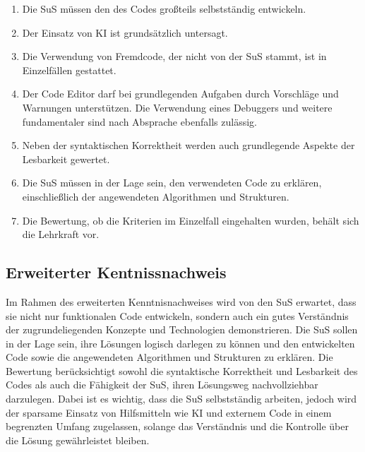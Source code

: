 \documentclass[a4paper,12pt]{article}
\begin{document}
\begin{enumerate}[label=\S\ \arabic*]
    \item Die SuS müssen den des Codes großteils selbstständig entwickeln.
    \item Der Einsatz von KI ist grundsätzlich untersagt.
    \item Die Verwendung von Fremdcode, der nicht von der SuS stammt, ist in Einzelfällen  gestattet.
    \item Der Code Editor darf bei grundlegenden Aufgaben durch Vorschläge und Warnungen unterstützen. Die Verwendung eines Debuggers und weitere fundamentaler sind nach Absprache ebenfalls zulässig.
    \item Neben der syntaktischen Korrektheit werden auch grundlegende Aspekte der Lesbarkeit gewertet.
    \item Die SuS müssen in der Lage sein, den verwendeten Code zu erklären, einschließlich der angewendeten Algorithmen und Strukturen.
    \item Die Bewertung, ob die Kriterien im Einzelfall eingehalten wurden, behält sich die Lehrkraft vor.
\end{enumerate}


\subsection{Erweiterter Kentnissnachweis}
Im Rahmen des erweiterten Kenntnisnachweises wird von den SuS erwartet, dass sie nicht nur funktionalen Code entwickeln, sondern auch ein gutes Verständnis der zugrundeliegenden Konzepte und Technologien demonstrieren. Die SuS sollen in der Lage sein, ihre Lösungen logisch darlegen zu können und den entwickelten Code sowie die angewendeten Algorithmen und Strukturen zu erklären. Die Bewertung berücksichtigt sowohl die syntaktische Korrektheit und Lesbarkeit des Codes als auch die Fähigkeit der SuS, ihren Lösungsweg nachvollziehbar darzulegen. Dabei ist es wichtig, dass die SuS selbstständig arbeiten, jedoch wird der sparsame Einsatz von Hilfsmitteln wie KI und externem Code in einem begrenzten Umfang zugelassen, solange das Verständnis und die Kontrolle über die Lösung gewährleistet bleiben.
\end{document}
